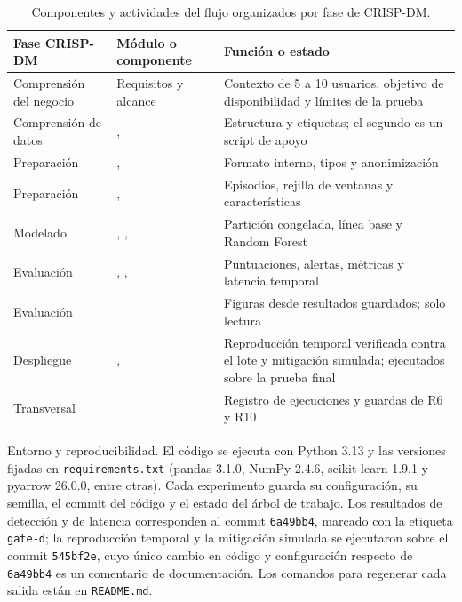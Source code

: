 \documentclass[journal]{IEEEtran}
\begin{document}
\begin{table}[t]
\caption{Componentes y actividades del flujo organizados por fase de CRISP-DM.}
\label{tab:modulos}
\centering
\footnotesize
\begin{tabularx}{\textwidth}{p{3.6cm}p{5.4cm}Y}
\hline
Fase CRISP-DM & Módulo o componente & Función o estado \\
\hline
Comprensión del negocio & Requisitos y alcance & Contexto de 5 a 10 usuarios, objetivo de disponibilidad y límites de la prueba \\
Comprensión de datos & ,  & Estructura y etiquetas; el segundo es un script de apoyo \\
Preparación & ,  & Formato interno, tipos y anonimización \\
Preparación & ,  & Episodios, rejilla de ventanas y características \\
Modelado & , ,  & Partición congelada, línea base y Random Forest \\
Evaluación & , ,  & Puntuaciones, alertas, métricas y latencia temporal \\
Evaluación &  & Figuras desde resultados guardados; solo lectura \\
Despliegue & ,  & Reproducción temporal verificada contra el lote y mitigación simulada; ejecutados sobre la prueba final \\
Transversal &  & Registro de ejecuciones y guardas de R6 y R10 \\
\hline
\end{tabularx}
\end{table}

Entorno y reproducibilidad. El código se ejecuta con Python 3.13 y las versiones fijadas en \texttt{requirements.txt} (pandas 3.1.0, NumPy 2.4.6, scikit-learn 1.9.1 y pyarrow 26.0.0, entre otras). Cada experimento guarda su configuración, su semilla, el commit del código y el estado del árbol de trabajo. Los resultados de detección y de latencia corresponden al commit \texttt{6a49bb4}, marcado con la etiqueta \texttt{gate-d}; la reproducción temporal y la mitigación simulada se ejecutaron sobre el commit \texttt{545bf2e}, cuyo único cambio en código y configuración respecto de \texttt{6a49bb4} es un comentario de documentación. Los comandos para regenerar cada salida están en \texttt{README.md}.
\end{document}
